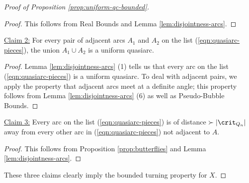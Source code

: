 \documentclass{amsart}
\begin{document}
\begin{proof}[Proof of Proposition \ref{prop:uniform-qc-bounded}]
    \begin{proof}
        This follows from Real Bounds and Lemma \ref{lem:disjointness-arcs}.
    \end{proof}
    
    \noindent \underline{Claim 2:}
        For every pair of adjacent arcs $A_1$ and $A_2$ on the list (\ref{eqn:quasiarc-pieces}), the union $A_1 \cup A_2$ is a uniform quasiarc.

    \begin{proof}
        Lemma \ref{lem:disjointness-arcs} (1) tells us that every arc on the list (\ref{eqn:quasiarc-pieces}) is a uniform quasiarc.
        To deal with adjacent pairs, we apply the property that adjacent arcs meet at a definite angle; this property follows from Lemma \ref{lem:disjointness-arcs} (6) as well as Pseudo-Bubble Bounds.
    \end{proof}
    
    \noindent \underline{Claim 3:} Every arc on the list (\ref{eqn:quasiarc-pieces}) is of distance $\succ|\crit_{Q_n}|$ away from every other arc in (\ref{eqn:quasiarc-pieces}) not adjacent to $A$.

    \begin{proof}
        This follows from Proposition \ref{prop:butterflies} and Lemma \ref{lem:disjointness-arcs}.
    \end{proof}

    These three claims clearly imply the bounded turning property for $X$.
\end{proof}


\setlength\arraycolsep{0pt}
    
\end{document}
